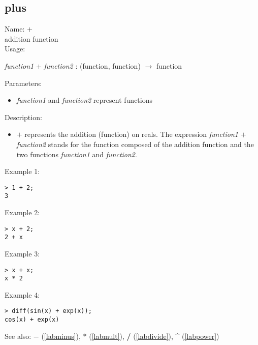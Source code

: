 \subsection{plus}
\label{labplus}
\noindent Name: \textbf{$+$}\\
addition function\\
\noindent Usage: 
\begin{center}
\emph{function1} \textbf{$+$} \emph{function2} : (\textsf{function}, \textsf{function}) $\rightarrow$ \textsf{function}
\\ 
\end{center}
Parameters: 
\begin{itemize}
\item \emph{function1} and \emph{function2} represent functions
\end{itemize}
\noindent Description: \begin{itemize}

\item \textbf{$+$} represents the addition (function) on reals. 
   The expression \emph{function1} \textbf{$+$} \emph{function2} stands for
   the function composed of the addition function and the two
   functions \emph{function1} and \emph{function2}.
\end{itemize}
\noindent Example 1: 
\begin{center}\begin{minipage}{15cm}\begin{Verbatim}[frame=single]
> 1 + 2;
3
\end{Verbatim}
\end{minipage}\end{center}
\noindent Example 2: 
\begin{center}\begin{minipage}{15cm}\begin{Verbatim}[frame=single]
> x + 2;
2 + x
\end{Verbatim}
\end{minipage}\end{center}
\noindent Example 3: 
\begin{center}\begin{minipage}{15cm}\begin{Verbatim}[frame=single]
> x + x;
x * 2
\end{Verbatim}
\end{minipage}\end{center}
\noindent Example 4: 
\begin{center}\begin{minipage}{15cm}\begin{Verbatim}[frame=single]
> diff(sin(x) + exp(x));
cos(x) + exp(x)
\end{Verbatim}
\end{minipage}\end{center}
See also: \textbf{$-$} (\ref{labminus}), \textbf{$*$} (\ref{labmult}), \textbf{/} (\ref{labdivide}), \textbf{\^} (\ref{labpower})

